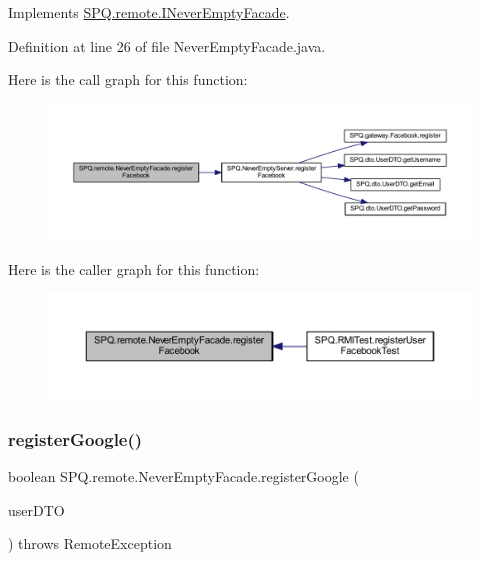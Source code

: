 Implements \mbox{\hyperlink{interface_s_p_q_1_1remote_1_1_i_never_empty_facade_a7b2f025522489fe9070d09a4fb08f0a1}{S\+P\+Q.\+remote.\+I\+Never\+Empty\+Facade}}.



Definition at line 26 of file Never\+Empty\+Facade.\+java.

Here is the call graph for this function\+:\nopagebreak
\begin{figure}[H]
\begin{center}
\leavevmode
\includegraphics[width=350pt]{class_s_p_q_1_1remote_1_1_never_empty_facade_aa9845001ecd5228135d64415a4c12b20_cgraph}
\end{center}
\end{figure}
Here is the caller graph for this function\+:\nopagebreak
\begin{figure}[H]
\begin{center}
\leavevmode
\includegraphics[width=350pt]{class_s_p_q_1_1remote_1_1_never_empty_facade_aa9845001ecd5228135d64415a4c12b20_icgraph}
\end{center}
\end{figure}
\mbox{\label{class_s_p_q_1_1remote_1_1_never_empty_facade_aaa8d4a6148957029af068d00da24890b}} 
\subsubsection{\texorpdfstring{register\+Google()}{registerGoogle()}}
{\footnotesize\ttfamily boolean S\+P\+Q.\+remote.\+Never\+Empty\+Facade.\+register\+Google (\begin{DoxyParamCaption}\item[{\mbox{\hyperlink{class_s_p_q_1_1dto_1_1_user_d_t_o}{User\+D\+TO}}}]{user\+D\+TO }\end{DoxyParamCaption}) throws Remote\+Exception}



